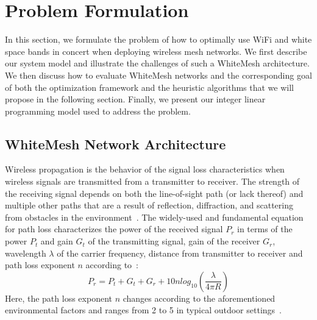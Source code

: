 \section{Problem Formulation}
\label{sec:problemformulation}

%

In this section, we formulate the problem of how to optimally 
use WiFi and white space bands in concert when deploying wireless 
mesh networks.  We first describe our system model and illustrate 
the challenges of such a WhiteMesh architecture.  We then discuss
how to evaluate WhiteMesh networks and the corresponding goal of
both the optimization framework and the heuristic algorithms that 
we will propose in the following section.  Finally, we present 
our integer linear programming model used to address the problem. 
 
\subsection{WhiteMesh Network Architecture}
\label{subsec:architecture}

Wireless propagation is the behavior of the signal loss characteristics 
when wireless signals are transmitted from a transmitter to receiver.
The strength of the receiving signal depends on both the line-of-sight
path (or lack thereof) and multiple other paths that are a result of 
reflection, diffraction, and scattering from obstacles in the 
environment~\cite{andersen1995propagation}. The widely-used and
fundamental equation for path loss characterizes the power of the
received signal $P_r$ in terms of the power $P_t$ and gain $G_t$ of
the transmitting signal, gain of the receiver $G_r$, wavelength 
$\lambda$ of the carrier frequency, distance from transmitter to receiver 
and path loss exponent $n$ according 
to~\cite{friis}:
\begin{equation}
\label{eq:friis}
P_r=P_t+G_t+G_r+10n log_{10}(\frac{\lambda}{4\pi R})
\end{equation}
Here, the path loss exponent \emph{$n$} changes according to the
aforementioned environmental factors and ranges from 2 to 5 in typical
outdoor settings~\cite{rappaport}.


